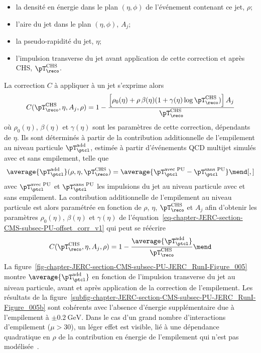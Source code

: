 \begin{itemize}
\item la densité en énergie dans le plan $(\eta, \phi)$ de l'événement contenant ce jet, $\rho$;
\item l'aire du jet dans le plan $(\eta, \phi)$, $A_j$;
\item la pseudo-rapidité du jet, $\eta$;
\item l'impulsion transverse du jet avant application de cette correction et après CHS, $\pT_\reco^\text{CHS}$.
\end{itemize}
La correction $C$ à appliquer à un jet s'exprime alors
\begin{equation}
C(\pT_\reco^\text{CHS}, \eta, A_j, \rho)
= 1 - \frac{\left[\rho_0(\eta) + \rho\,\beta(\eta)(1+\gamma(\eta)\log\pT_\reco^\text{CHS})\right]A_j}{\pT_\reco^\text{CHS}}
\label{eq-chapter-JERC-section-CMS-subsec-PU-offset_corr_v1}
\end{equation}
où $\rho_0(\eta)$, $\beta(\eta)$ et $\gamma(\eta)$ sont les paramètres de cette correction, dépendants de $\eta$.
Ils sont déterminés à partir de la contribution additionnelle de l'empilement au niveau particule $\pT_\ptcl^\text{add}$, estimée à partir d'événements QCD multijet simulés avec et sans empilement, telle que
\begin{equation}
\average{\pT_\ptcl^\text{add}}(\rho, \eta, \pT_\reco^\text{CHS})
=
\average{\pT_\ptcl^\text{avec PU} - \pT_\ptcl^\text{sans PU}}
\mend[,]
\label{eq-chapter-JERC-section-CMS-subsec-PU-pTaddptcl}
\end{equation}
avec
$\pT_\ptcl^\text{avec PU}$ et $\pT_\ptcl^\text{sans PU}$
les impulsions du jet au niveau particule avec et sans empilement.
La contribution additionnelle de l'empilement au niveau particule est alors paramétrée en fonction de $\rho$, $\eta$, $\pT_\reco^\text{CHS}$ et $A_j$ afin d'obtenir les paramètres $\rho_0(\eta)$, $\beta(\eta)$ et $\gamma(\eta)$ de l'équation~\eqref{eq-chapter-JERC-section-CMS-subsec-PU-offset_corr_v1} qui peut se réécrire
\begin{equation}
C(\pT_\reco^\text{CHS}, \eta, A_j, \rho)
= 1 - \frac{\average{\pT_\ptcl^\text{add}}}{\pT_\reco^\text{CHS}}
\mend
\label{eq-chapter-JERC-section-CMS-subsec-PU-offset_corr_v2}
\end{equation}
La figure~\ref{fig-chapter-JERC-section-CMS-subsec-PU-JERC_RunI-Figure_005} montre $\average{\pT_\ptcl^\text{add}}$ en fonction de l'impulsion transverse du jet au niveau particule, avant et après application de la correction de l'empilement.
Les résultats de la figure~\ref{subfig-chapter-JERC-section-CMS-subsec-PU-JERC_RunI-Figure_005b} sont cohérents avec l'absence d'énergie supplémentaire due à l'empilement à $\pm\SI{0.2}{\GeV}$. Dans le cas d'un grand nombre d'interactions d'empilement ($\mu>30$), un léger effet est visible, lié à une dépendance quadratique en $\rho$ de la contribution en énergie de l'empilement qui n'est pas modélisée~\cite{JERC_RunI}.
